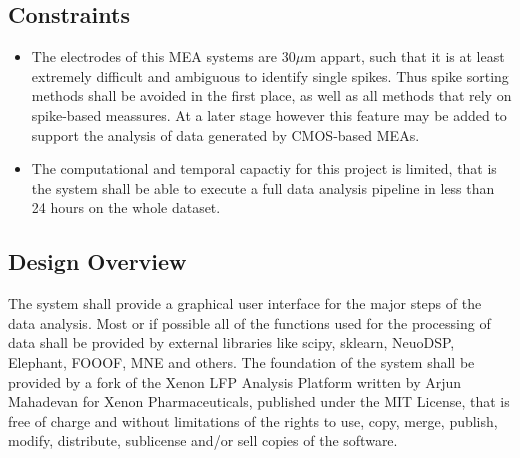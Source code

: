 \documentclass[a4paper]{article}
\begin{document}
	\subsection{Constraints}
		\begin{itemize}
			\item The electrodes of this MEA systems are $30\mu$m appart, such that it is at least extremely difficult and ambiguous to identify single spikes. 
			Thus spike sorting methods shall be avoided in the first place, as well as all methods that rely on spike-based meassures. 
			At a later stage however this feature may be added to support the analysis of data generated by CMOS-based MEAs.
			\item The computational and temporal capactiy for this project is limited, that is the system shall be able to execute a full data analysis pipeline in less than 24 hours on the whole dataset.
		\end{itemize}


	\subsection{Design Overview}
		The system shall provide a graphical user interface for the major steps of the data analysis. 
		Most or if possible all of the functions used for the processing of data shall be provided by external libraries like scipy, sklearn, NeuoDSP, Elephant, FOOOF, MNE and others. 
		The foundation of the system shall be provided by a fork of the Xenon LFP Analysis Platform written by Arjun Mahadevan for Xenon Pharmaceuticals, published under the MIT License, that is free of charge and without limitations of the rights to use, copy, merge, publish, modify, distribute, sublicense and/or sell copies of the software.
			
\end{document}
